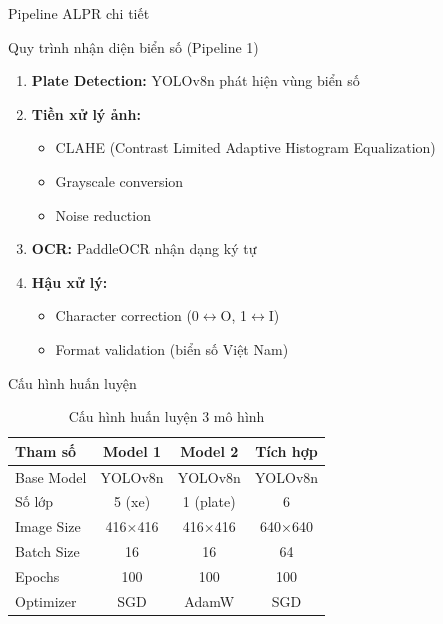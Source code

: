 \begin{frame}{Pipeline ALPR chi tiết}
    \begin{block}{Quy trình nhận diện biển số (Pipeline 1)}
    \begin{enumerate}
        \item \textbf{Plate Detection:} YOLOv8n phát hiện vùng biển số
        \item \textbf{Tiền xử lý ảnh:}
        \begin{itemize}
            \item CLAHE (Contrast Limited Adaptive Histogram Equalization)
            \item Grayscale conversion
            \item Noise reduction
        \end{itemize}
        \item \textbf{OCR:} PaddleOCR nhận dạng ký tự
        \item \textbf{Hậu xử lý:}
        \begin{itemize}
            \item Character correction (0$\leftrightarrow$O, 1$\leftrightarrow$I)
            \item Format validation (biển số Việt Nam)
        \end{itemize}
    \end{enumerate}
    \end{block}
\end{frame}

\begin{frame}{Cấu hình huấn luyện}
    \begin{table}
        \centering
        \begin{tabular}{|l|c|c|c|}
            \hline
            \textbf{Tham số} & \textbf{Model 1} & \textbf{Model 2} & \textbf{Tích hợp} \\
            \hline
            Base Model & YOLOv8n & YOLOv8n & YOLOv8n \\
            \hline
            Số lớp & 5 (xe) & 1 (plate) & 6 \\
            \hline
            Image Size & 416×416 & 416×416 & 640×640 \\
            \hline
            Batch Size & 16 & 16 & 64 \\
            \hline
            Epochs & 100 & 100 & 100 \\
            \hline
            Optimizer & SGD & AdamW & SGD \\
            \hline
        \end{tabular}
        \caption{Cấu hình huấn luyện 3 mô hình}
    \end{table}
\end{frame}

